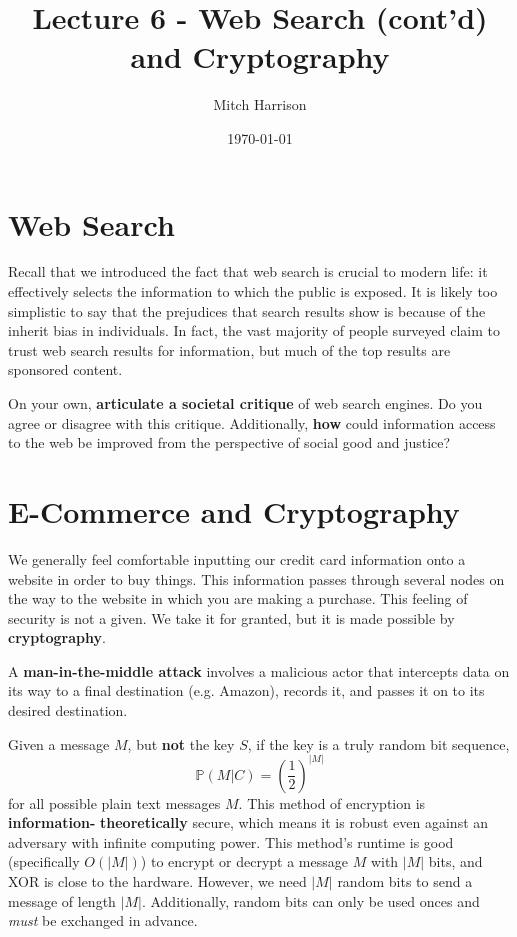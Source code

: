 \documentclass[titlepage, 12pt, leqno]{article}
\title{\Huge{Lecture 6 - Web Search (cont'd) and Cryptography}}
\author{\large{Mitch Harrison}}
\date{\today}
\begin{document}
\setlength{\parskip}{1\baselineskip}
\setlength{\parindent}{15pt}
\maketitle
\tableofcontents
\newpage


\section{Web Search}

Recall that we introduced the fact that web search is crucial to modern life: it
effectively selects the information to which the public is exposed. It is likely
too simplistic to say that the prejudices that search results show is because of
the inherit bias in individuals. In fact, the vast majority of people surveyed
claim to trust web search results for information, but much of the top results are
sponsored content.

\begin{ex}
    On your own, \textbf{articulate a societal critique} of web search engines. Do
    you agree or disagree with this critique. Additionally, \textbf{how} could
    information access to the web be improved from the perspective of social
    good and justice?
\end{ex}

\pagebreak
\section{E-Commerce and Cryptography}
We generally feel comfortable inputting our credit card information onto a 
website in order to buy things. This information passes through several nodes on
the way to the website in which you are making a purchase. This feeling of
security is not a given. We take it for granted, but it is made possible by 
\textbf{cryptography}.

\begin{definition}
    A \textbf{man-in-the-middle attack} involves a malicious actor that intercepts
    data on its way to a final destination (e.g. Amazon), records it, and passes
    it on to its desired destination.
\end{definition}

Given a message $M$, but \textbf{not} the key $S$, if the key is a truly random
bit sequence,
\[
\mathbb{P}(M|C) = \left(\frac{1}{2}\right)^{|M|}
\]
for all possible plain text messages $M$. This method of encryption is
\textbf{information-} \textbf{theoretically} secure, which means it is robust 
even against an adversary with infinite computing power. This method's runtime is 
good (specifically $O(|M|)$) to encrypt or decrypt a message $M$ with $|M|$ bits,
and XOR is close to the hardware. However, we need $|M|$ random bits to send a 
message of length $|M|$. Additionally, random bits can only be used onces and 
\textit{must} be exchanged in advance.
\end{document}
